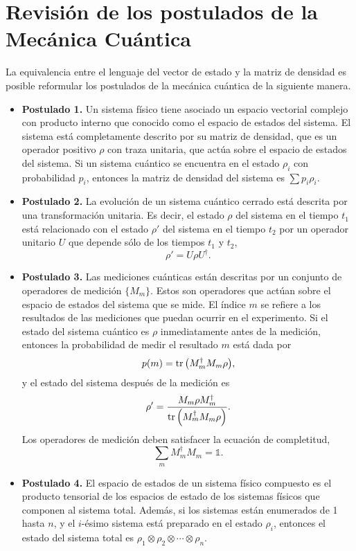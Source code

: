 \section{Revisión de los postulados de la Mecánica Cuántica} %
La equivalencia entre el lenguaje del vector de estado y la matriz de 
densidad es posible reformular los postulados de la mecánica cuántica 
de la siguiente manera.
\begin{itemize}
	\item[] \textbf{Postulado 1.} Un sistema físico tiene asociado un espacio vectorial complejo
	con producto interno que conocido como el espacio de estados del
	sistema. El sistema está completamente descrito por su matriz de densidad,
	que es un operador positivo $\rho$ con traza unitaria, que actúa sobre 
	el espacio de estados del sistema. Si un sistema cuántico se encuentra
	en el estado $\rho _i$ con probabilidad $p_i$, entonces la matriz de
	densidad del sistema es $\sum p_i\rho_i$.
	\item[] \textbf{Postulado 2.} La evolución de un sistema cuántico cerrado está descrita por una transformación
	unitaria. Es decir, el estado $\rho$ del sistema en el tiempo $t_1$ está 
	relacionado con el estado $\rho'$ del sistema en el tiempo $t_2$ por un operador
	unitario $U$ que depende sólo de los tiempos $t_1$ y $t_2$,
	\begin{equation}
	\rho'=U\rho U^{\dagger}.
	\label{eq:postulate1}
	\end{equation}
	\item[] \textbf{Postulado 3.} Las mediciones cuánticas están descritas por un conjunto de 
	operadores de medición $\{M_m\}$. Estos son operadores que actúan sobre el espacio 
	de estados del sistema que se mide. El índice $m$ se refiere a los resultados
	de las mediciones que puedan ocurrir en el experimento. Si el estado del sistema
	cuántico es $\rho$ inmediatamente antes de la medición, entonces la probabilidad
	de medir el resultado $m$ está dada por
	\begin{equation}
	p(m)=\tr \qty(M_m^{\dagger}M_m\rho),
	\label{eq:postulate2_prob}
	\end{equation}						
	y el estado del sistema después de la medición es
	\begin{equation}
	\rho'=\frac{M_m\rho M_m^{\dagger}}{\tr \qty(M_m^{\dagger}M_m\rho)}.
	\label{eq:postulate2_rhoPrime}
	\end{equation}	
	Los operadores de medición deben satisfacer la ecuación de completitud,
	\begin{equation}
	\sum _m M_m^{\dagger}M_m=\mathbb{1}.
	\label{eq:postulate2_completeness}
	\end{equation}
	\item[] \textbf{Postulado 4.} El espacio de estados de un sistema físico compuesto es el producto tensorial 
	de los espacios de estado de los sistemas físicos que componen al sistema total.
	Además, si los sistemas están enumerados de 1 hasta $n$, y el $i$-ésimo sistema
	está preparado en el estado $\rho_i$, entonces el estado del sistema total es
	$\rho_1\otimes\rho_2\otimes\cdots\otimes\rho_n$.
\end{itemize}
